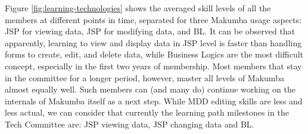\documentclass{llncs}
\begin{document}

Figure \ref{fig:learning-technologies} shows the averaged skill levels of all the members at different points in time, separated for three Makumba usage aspects: JSP for viewing data, JSP for modifying data, and BL. It can be observed that apparently, learning to view and display data in JSP level is faster than handling forms to create, edit, and delete data, while Business Logics are the most difficult concept, especially in the first two years of membership. Most members that stay in the committee for a longer period, however, master all levels of Makumba almost equally well. Such members can (and many do) continue working on the internals of Makumba itself  as a next step. While MDD editing skills are less and less actual, we can consider that currently the learning path milestones in the Tech Committee are: JSP viewing data, JSP changing data and BL.
\end{document}

